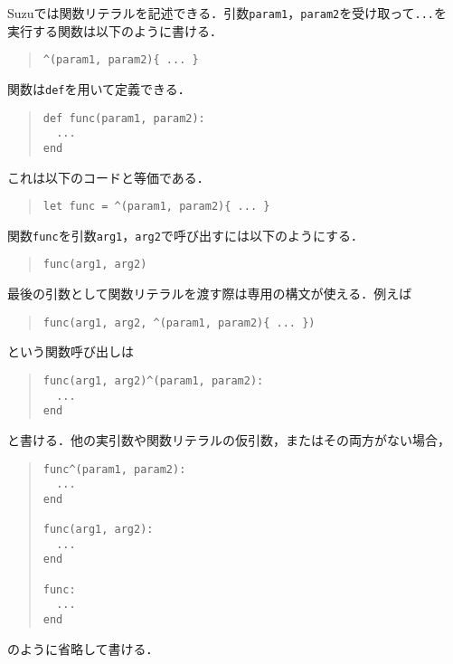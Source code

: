 \documentclass[a4paper,11pt,dvipdfmx]{jreport}
\begin{document}
Suzuでは関数リテラルを記述できる．引数\verb|param1|，\verb|param2|を受け取って\verb|...|を
実行する関数は以下のように書ける．
\begin{quote}
\begin{verbatim}
^(param1, param2){ ... }
\end{verbatim}
\end{quote}

関数は\verb|def|を用いて定義できる．
\begin{quote}
\begin{verbatim}
def func(param1, param2):
  ...
end
\end{verbatim}
\end{quote}
これは以下のコードと等価である．
\begin{quote}
\begin{verbatim}
let func = ^(param1, param2){ ... }
\end{verbatim}
\end{quote}

関数\verb|func|を引数\verb|arg1|，\verb|arg2|で呼び出すには以下のようにする．
\begin{quote}
\begin{verbatim}
func(arg1, arg2)
\end{verbatim}
\end{quote}

最後の引数として関数リテラルを渡す際は専用の構文が使える．例えば
\begin{quote}
\begin{verbatim}
func(arg1, arg2, ^(param1, param2){ ... })
\end{verbatim}
\end{quote}
という関数呼び出しは
\begin{quote}
\begin{verbatim}
func(arg1, arg2)^(param1, param2):
  ...
end
\end{verbatim}
\end{quote}
と書ける．他の実引数や関数リテラルの仮引数，またはその両方がない場合，
\begin{quote}
\begin{verbatim}
func^(param1, param2):
  ...
end

func(arg1, arg2):
  ...
end

func:
  ...
end
\end{verbatim}
\end{quote}
のように省略して書ける．
\end{document}
